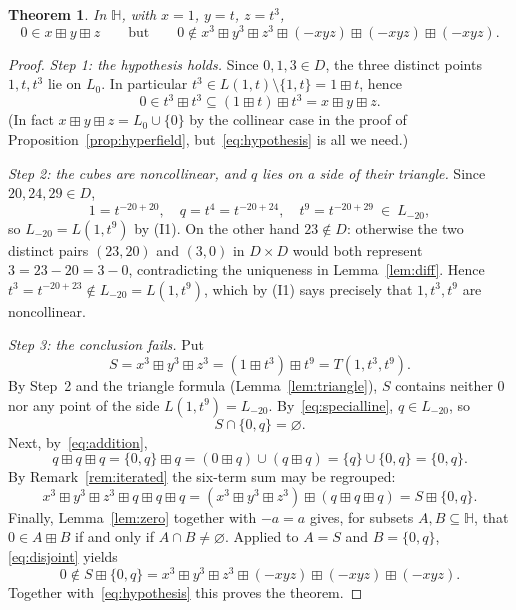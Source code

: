 \documentclass[11pt]{article}
\theoremstyle{plain}
\newtheorem{theorem}{Theorem}[section]
\theoremstyle{definition}
\newcommand{\Hh}{\mathbb{H}}
\newcommand{\bp}{\boxplus}
\begin{document}
\begin{theorem}\label{thm:counterexample}
In $\Hh$, with $x=1$, $y=t$, $z=t^3$,
\[
 0\in x\bp y\bp z
 \qquad\text{but}\qquad
 0\notin x^3\bp y^3\bp z^3\bp(-xyz)\bp(-xyz)\bp(-xyz).
\]
\end{theorem}
\begin{proof}
\emph{Step 1: the hypothesis holds.}  Since $0,1,3\in D$, the three
distinct points $1,t,t^3$ lie on $L_0$.  In particular
$t^3\in L(1,t)\setminus\{1,t\}=1\bp t$, hence
\begin{equation}\label{eq:hypothesis}
 0\in t^3\bp t^3\subseteq(1\bp t)\bp t^3=x\bp y\bp z .
\end{equation}
(In fact $x\bp y\bp z=L_0\cup\{0\}$ by the collinear case in the proof
of Proposition~\ref{prop:hyperfield}, but~\eqref{eq:hypothesis} is all
we need.)

\emph{Step 2: the cubes are noncollinear, and $q$ lies on a side of
their triangle.}  Since $20,24,29\in D$,
\begin{equation}\label{eq:specialline}
 1=t^{-20+20},\quad q=t^4=t^{-20+24},\quad t^9=t^{-20+29}\ \in\ L_{-20},
\end{equation}
so $L_{-20}=L(1,t^9)$ by (I1).  On the other hand $23\notin D$:
otherwise the two distinct pairs $(23,20)$ and $(3,0)$ in $D\times D$
would both represent $3=23-20=3-0$, contradicting the uniqueness in
Lemma~\ref{lem:diff}.  Hence $t^3=t^{-20+23}\notin L_{-20}=L(1,t^9)$,
which by (I1) says precisely that $1,t^3,t^9$ are noncollinear.

\emph{Step 3: the conclusion fails.}  Put
\[
 S=x^3\bp y^3\bp z^3=(1\bp t^3)\bp t^9=T(1,t^3,t^9).
\]
By Step~2 and the triangle formula (Lemma~\ref{lem:triangle}), $S$
contains neither $0$ nor any point of the side $L(1,t^9)=L_{-20}$.
By~\eqref{eq:specialline}, $q\in L_{-20}$, so
\begin{equation}\label{eq:disjoint}
 S\cap\{0,q\}=\varnothing .
\end{equation}
Next, by~\eqref{eq:addition},
\[
 q\bp q\bp q=\{0,q\}\bp q=(0\bp q)\cup(q\bp q)=\{q\}\cup\{0,q\}=\{0,q\}.
\]
By Remark~\ref{rem:iterated} the six-term sum may be regrouped:
\[
 x^3\bp y^3\bp z^3\bp q\bp q\bp q
 =(x^3\bp y^3\bp z^3)\bp(q\bp q\bp q)=S\bp\{0,q\}.
\]
Finally, Lemma~\ref{lem:zero} together with $-a=a$ gives, for subsets
$A,B\subseteq\Hh$, that $0\in A\bp B$ if and only if
$A\cap B\neq\varnothing$.  Applied to $A=S$ and $B=\{0,q\}$,
\eqref{eq:disjoint} yields
\[
 0\notin S\bp\{0,q\}
 =x^3\bp y^3\bp z^3\bp(-xyz)\bp(-xyz)\bp(-xyz).
\]
Together with~\eqref{eq:hypothesis} this proves the theorem.
\end{proof}
\end{document}
